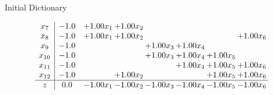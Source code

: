 \documentclass[8pt]{article}
\begin{document}
Initial Dictionary 

\[\begin{array}{c| c c@{\hskip 2pt} c@{\hskip 2pt} c@{\hskip 2pt} c@{\hskip 2pt} c@{\hskip 2pt} c@{\hskip 2pt} }
 x_{7}   &  -1.0 & +  1.00 x_{1} & +  1.00 x_{2} &    &    &    &   \\
 x_{8}   &  -1.0 & +  1.00 x_{1} & +  1.00 x_{2} &    &    &   & +  1.00 x_{6}\\
 x_{9}   &  -1.0  &    &   & +  1.00 x_{3} & +  1.00 x_{4} &    &   \\
 x_{10}   &  -1.0  &    &   & +  1.00 x_{3} & +  1.00 x_{4} & +  1.00 x_{5} &   \\
 x_{11}   &  -1.0  &    &    &   & +  1.00 x_{4} & +  1.00 x_{5} & +  1.00 x_{6}\\
 x_{12}   &  -1.0  &   & +  1.00 x_{2} &    &   & +  1.00 x_{5} & +  1.00 x_{6}\\
\hline
z    &  0.0 & -1.00 x_{1} & -1.00 x_{2} & -1.00 x_{3} & -1.00 x_{4} & -1.00 x_{5} & -1.00 x_{6}\\
\end{array}\]
\end{document}
